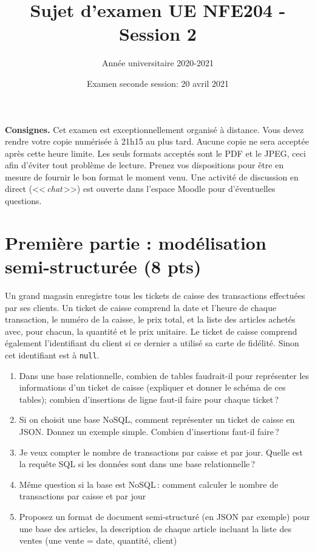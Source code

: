\documentclass[11pt,a4paper]{article}
\newcommand{\guill}[1]{<<\,#1\,>>}
\begin{document}
\title{Sujet d'examen UE NFE204 - Session 2}
\author{Année universitaire 2020-2021}
\date{Examen seconde session: 20 avril 2021}

\maketitle

{\bf \Large Consignes.}
Cet examen est exceptionnellement organisé à distance. 
Vous devez rendre votre copie numérisée à 21h15 au plus tard. 
Aucune copie ne sera acceptée après cette heure limite. 
Les seuls formats acceptés sont le PDF et le JPEG, ceci afin d'éviter tout problème de lecture.  
Prenez vos dispositions pour être en mesure de fournir le bon format le moment venu. Une activité 
de discussion en direct (\guill{\textit{chat}}) est ouverte dans l'espace Moodle pour d'éventuelles questions.


\section*{Première partie : modélisation semi-structurée (8 pts)}

Un grand magasin enregistre tous les tickets de caisse des transactions effectuées par ses clients.
Un ticket de caisse comprend la date et l'heure de chaque transaction, le numéro de la caisse, le prix total,
et la liste des articles achetés avec, pour chacun, la quantité et le prix unitaire.  Le ticket de caisse comprend également
l'identifiant du client si ce dernier a utilisé sa carte de fidélité. Sinon cet identifiant
est à \texttt{null}.


\begin{enumerate}
  \item Dans une base relationnelle, combien de tables faudrait-il pour représenter 
         les informations d'un ticket de caisse (expliquer et donner le schéma de ces tables); combien d'insertions de ligne
             faut-il faire pour chaque ticket\,?
    \item Si on choisit une base NoSQL, comment représenter un ticket de caisse en JSON.
        Donnez un exemple simple. Combien d'insertions faut-il faire\,?
   \item Je veux compter le nombre de transactions par caisse et par jour.  Quelle est la requête SQL si les données
       sont dans une base relationnelle\,?
    \item Même question si la base est NoSQL\,: comment calculer le nombre de transactions par caisse et par jour
    \item Proposez un format de document semi-structuré (en JSON par exemple) pour une base
         des articles, la description de chaque article incluant la liste des ventes (une vente = date,
         quantité, client)
 \end{enumerate}
\end{document}
